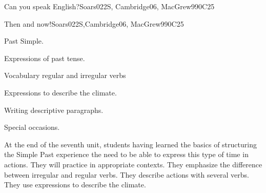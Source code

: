 \begin{syllabus}
\begin{unit}{Can you speak English?}{}{Soars022S, Cambridge06, MacGrew99}{0}{C25}
\end{unit}

\begin{unit}{Then and now!}{}{Soars022S,Cambridge06, MacGrew99}{0}{C25}
   \begin{topics}
      \item Past Simple.
      \item Expressions of past tense.
      \item Vocabulary regular and irregular verbs
      \item Expressions to describe the climate. 
      \item Writing descriptive paragraphs.
      \item Special occasions.
   \end{topics}

   \begin{learningoutcomes}
      \item At the end of the seventh unit, students having learned the basics of structuring the Simple Past experience the need to be able to express this type of time in actions. They will practice in appropriate contexts. They emphasize the difference between irregular and regular verbs. They describe actions with several verbs. They use expressions to describe the climate.
   \end{learningoutcomes}
\end{unit}

\begin{coursebibliography}
\end{coursebibliography}
\end{syllabus}
%
